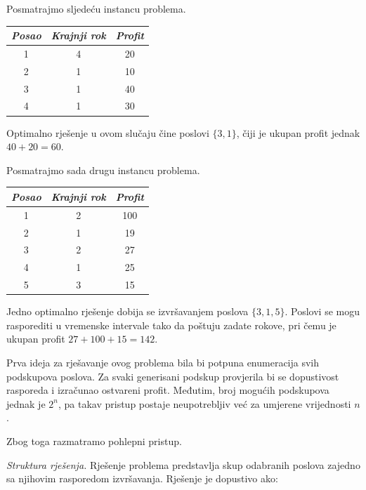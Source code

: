 \begin{solution}
	
	Posmatrajmo sljedeću instancu problema.
	
	\begin{center}
		\begin{tabular}{ccc}
			\emph{Posao} & \emph{Krajnji rok} & \emph{Profit} \\ \hline \hline 
			1 & 4 & 20 \\
			2 & 1 & 10 \\
			3 & 1 & 40 \\
			4 & 1 & 30 \\ \hline
		\end{tabular}
	\end{center}
	
	Optimalno rješenje u ovom slučaju čine poslovi $\{3,1\}$, čiji je ukupan profit jednak $40 + 20 = 60.$
	
	Posmatrajmo sada drugu instancu problema.
	
	\begin{center}
		\begin{tabular}{ccc}
			\emph{Posao} & \emph{Krajnji rok} & \emph{Profit} \\  \hline \hline
			1 & 2 & 100 \\
			2 & 1 & 19 \\
			3 & 2 & 27 \\
			4 & 1 & 25 \\
			5 & 3 & 15 \\ \hline
		\end{tabular}
	\end{center}
	
	Jedno optimalno rješenje dobija se izvršavanjem poslova $\{3,1,5\}$. Poslovi se mogu rasporediti u vremenske intervale tako da poštuju zadate rokove, pri čemu je ukupan profit $27 + 100 + 15 = 142.$
	
	\medskip
	
	Prva ideja za rješavanje ovog problema bila bi potpuna enumeracija svih podskupova poslova. Za svaki generisani podskup provjerila bi se dopustivost rasporeda i izračunao ostvareni profit. Međutim, broj mogućih podskupova jednak je $2^n$, pa takav pristup postaje neupotrebljiv već za umjerene vrijednosti $n$.
	
	Zbog toga razmatramo pohlepni pristup.
	
	\medskip
	
	\textit{Struktura rješenja.} Rješenje problema predstavlja skup odabranih poslova zajedno sa njihovim rasporedom izvršavanja. Rješenje je dopustivo ako:
	

\end{solution}
